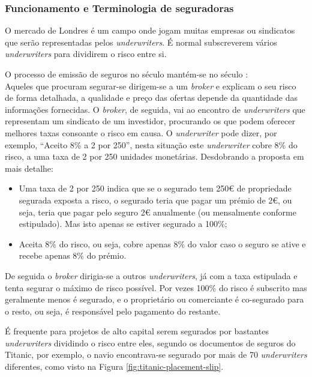         \subsubsection{Funcionamento e Terminologia de seguradoras}\label{secsec:mercado-de-londres-tradicional}

            O mercado de Londres é um campo onde jogam muitas empresas ou sindicatos que serão representadas pelos \textit{underwriters}. É normal subscreverem vários \textit{underwriters} para dividirem o risco entre si.

            O processo de emissão de seguros no século  mantém-se no século : \\
            Aqueles que procuram segurar-se dirigem-se a um \textit{broker} e explicam o seu risco de forma detalhada, a qualidade e preço das ofertas depende da quantidade das informações fornecidas. O \textit{broker}, de seguida, vai ao encontro de \textit{underwriters} que representam um sindicato de um investidor, procurando os que podem oferecer melhores taxas consoante o risco em causa. O \textit{underwriter} pode dizer, por exemplo, ``Aceito 8\% a 2 por 250'', nesta situação este \textit{underwriter} cobre 8\% do risco, a uma taxa de 2 por 250 unidades monetárias. Desdobrando a proposta em mais detalhe:
            \begin{itemize}
                \item Uma taxa de 2 por 250 indica que se o segurado tem 250€ de propriedade segurada exposta a risco, o segurado teria que pagar um prémio de 2€, ou seja, teria que pagar pelo seguro 2€ anualmente (ou mensalmente conforme estipulado). Mas isto apenas se estiver segurado a 100\%;
                \item Aceita 8\% do risco, ou seja, cobre apenas 8\% do valor caso o seguro se ative e recebe apenas 8\% do prémio.
            \end{itemize}
            De seguida o \textit{broker} dirigia-se a outros \textit{underwriters}, já com a taxa estipulada e tenta segurar o máximo de risco possível. Por vezes 100\% do risco é subscrito mas geralmente menos é segurado, e o proprietário ou comerciante é co-segurado para o resto, ou seja, é responsável pelo pagamento do restante\cite{rate-making,lloyds-and-the-great-fire-of-london-propertycasualty360}.

            É frequente para projetos de alto capital serem segurados por bastantes \textit{underwriters} dividindo o risco entre eles, segundo os documentos de seguros do Titanic, por exemplo, o navio encontrava-se segurado por mais de 70 \textit{underwriters} diferentes\cite{titanic2,titanic}, como visto na Figura \ref{fig:titanic-placement-slip}.

